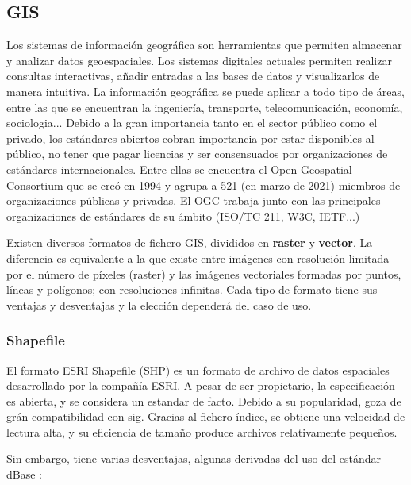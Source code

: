 \subsection{GIS} Los sistemas de información geográfica son herramientas que permiten almacenar y analizar datos
geoespaciales. Los sistemas digitales actuales permiten realizar consultas interactivas, añadir entradas a las
bases de datos y visualizarlos de manera intuitiva. La información geográfica se puede aplicar a todo tipo de
áreas, entre las que se encuentran la ingeniería, transporte, telecomunicación, economía, sociologia... Debido a
la gran importancia tanto en el sector público como el privado\cite{gis-standards}, los estándares abiertos
cobran importancia por estar disponibles al público, no tener que pagar licencias y ser consensuados por
organizaciones de estándares internacionales. Entre ellas se encuentra el Open Geospatial Consortium que se creó
en 1994 y agrupa a 521 (en marzo de 2021) miembros de organizaciones públicas y privadas.\cite{ogc-members}
El OGC trabaja junto con las principales organizaciones de estándares de su ámbito (ISO/TC 211, W3C,
IETF...) \cite{ogc-whitepaper}

Existen diversos formatos de fichero GIS, divididos en \textbf{raster} y \textbf{vector}. La diferencia es
equivalente a la que existe entre imágenes con resolución limitada por el número de píxeles (raster) y las 
imágenes vectoriales formadas por puntos, líneas y polígonos; con resoluciones infinitas. Cada tipo de formato
tiene sus ventajas y desventajas y la elección dependerá del caso de uso. 

\subsubsection{Shapefile} El formato ESRI Shapefile (SHP) es un formato de archivo de datos espaciales
desarrollado por la compañía ESRI. A pesar de ser propietario, la especificación es abierta, y se considera un
estandar de facto. Debido a su popularidad, goza de grán compatibilidad con sig. Gracias al fichero índice, se
obtiene una velocidad de lectura alta, y su eficiencia de tamaño produce archivos relativamente pequeños.

Sin embargo, tiene varias desventajas, algunas derivadas del uso del estándar dBase \cite{shapefile-specs}
\cite{shapefile-no}: 

